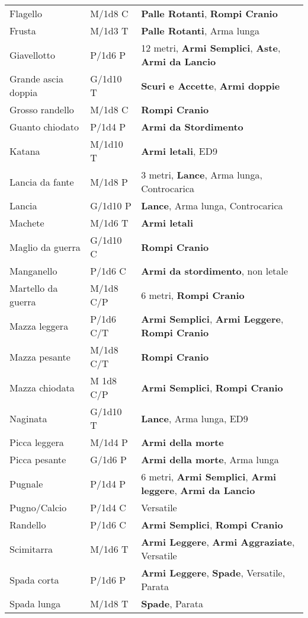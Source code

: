 \documentclass[landscape,10pt,a4paper]{article}
\begin{document}
\begin{multicols}{2}
\begin{dmbox}[title=Armi - pagina \pageref{equipaggiamentoarmi}]
{\begin{tabularx}{1\linewidth}{lll}
Flagello& M/1d8 C& \textbf{Palle Rotanti}, \textbf{Rompi Cranio}\\
Frusta& M/1d3 T& \textbf{Palle Rotanti}, Arma lunga\\
Giavellotto& P/1d6 P& 12 metri, \textbf{Armi Semplici}, \textbf{Aste}, \textbf{Armi da Lancio}\\
Grande ascia doppia& G/1d10 T& \textbf{Scuri e Accette}, \textbf{Armi doppie}\\
Grosso randello& M/1d8 C&\textbf{Rompi Cranio}\\
Guanto chiodato& P/1d4 P&\textbf{Armi da Stordimento}\\
Katana& M/1d10 T& \textbf{Armi letali}, ED9\\
Lancia da fante& M/1d8 P&3 metri, \textbf{Lance}, Arma lunga, Controcarica\\
Lancia& G/1d10 P&\textbf{Lance}, Arma lunga, Controcarica\\
Machete& M/1d6 T&\textbf{Armi letali}\\
Maglio da guerra& G/1d10 C& \textbf{Rompi Cranio}\\
Manganello& P/1d6 C& \textbf{Armi da stordimento}, non letale\\
Martello da guerra& M/1d8 C/P& 6 metri, \textbf{Rompi Cranio}\\
Mazza leggera& P/1d6 C/T& \textbf{Armi Semplici}, \textbf{Armi Leggere}, \textbf{Rompi Cranio} \\
Mazza pesante& M/1d8 C/T& \textbf{Rompi Cranio}\\ 
Mazza chiodata& M 1d8 C/P& \textbf{Armi Semplici}, \textbf{Rompi Cranio}\\
Naginata& G/1d10 T&\textbf{Lance}, Arma lunga, ED9\\
Picca leggera& M/1d4 P&\textbf{Armi della morte}\\
Picca pesante& G/1d6 P&\textbf{Armi della morte}, Arma lunga\\
Pugnale& P/1d4 P& 6 metri, \textbf{Armi Semplici}, \textbf{Armi leggere}, \textbf{Armi da Lancio}\\
Pugno/Calcio & P/1d4 C&Versatile\\
Randello& P/1d6 C& \textbf{Armi Semplici}, \textbf{Rompi Cranio}\\
Scimitarra& M/1d6 T&\textbf{Armi Leggere}, \textbf{Armi Aggraziate}, Versatile\\
Spada corta& P/1d6 P&\textbf{Armi Leggere}, \textbf{Spade}, Versatile, Parata\\
Spada lunga& M/1d8 T&\textbf{Spade}, Parata\\

\end{tabularx}}
\end{dmbox}
\end{multicols}
\end{document}
